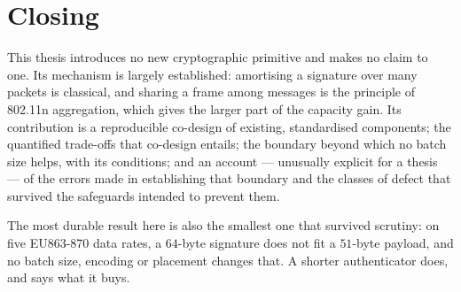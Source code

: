 \section{Closing}

This thesis introduces no new cryptographic primitive and makes no claim to one. Its mechanism is
largely established: amortising a signature over many packets is classical, and sharing a frame
among messages is the principle of 802.11n aggregation, which gives the larger part of the
capacity gain. Its contribution
is a reproducible co-design of existing, standardised components; the quantified trade-offs that
co-design entails; the boundary beyond which no batch size helps, with its conditions; and an
account --- unusually explicit for a thesis --- of the errors made in establishing that boundary and
the classes of defect that survived the safeguards intended to prevent them.

The most durable result here is also the smallest one that survived scrutiny: on five EU863-870
data rates, a $64$-byte signature does not fit a $51$-byte payload, and no batch size, encoding
or placement changes that. A shorter authenticator does, and  says what it
buys.
